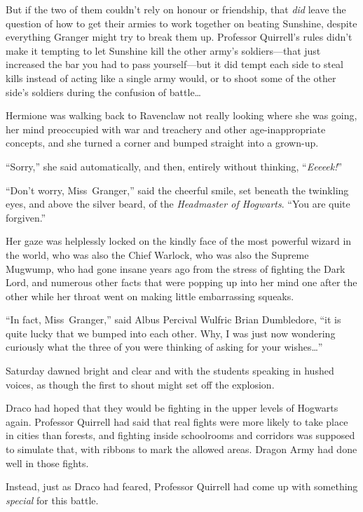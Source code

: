 But if the two of them couldn’t rely on honour or friendship, that \emph{did} leave the question of how to get their armies to work together on beating Sunshine, despite everything Granger might try to break them up. Professor Quirrell’s rules didn’t make it tempting to let Sunshine kill the other army’s soldiers—that just increased the bar you had to pass yourself—but it did tempt each side to steal kills instead of acting like a single army would, or to shoot some of the other side’s soldiers during the confusion of battle…

\later

Hermione was walking back to Ravenclaw not really looking where she was going, her mind preoccupied with war and treachery and other age-inappropriate concepts, and she turned a corner and bumped straight into a grown-up.

“Sorry,” she said automatically, and then, entirely without thinking, “\emph{Eeeeek!}”

“Don’t worry, Miss~Granger,” said the cheerful smile, set beneath the twinkling eyes, and above the silver beard, of the \emph{Headmaster of Hogwarts}. “You are quite forgiven.”

Her gaze was helplessly locked on the kindly face of the most powerful wizard in the world, who was also the Chief Warlock, who was also the Supreme Mugwump, who had gone insane years ago from the stress of fighting the Dark Lord, and numerous other facts that were popping up into her mind one after the other while her throat went on making little embarrassing squeaks.

“In fact, Miss~Granger,” said Albus Percival Wulfric Brian Dumbledore, “it is quite lucky that we bumped into each other. Why, I was just now wondering curiously what the three of you were thinking of asking for your wishes…”

\later

Saturday dawned bright and clear and with the students speaking in hushed voices, as though the first to shout might set off the explosion.

\later

Draco had hoped that they would be fighting in the upper levels of Hogwarts again. Professor Quirrell had said that real fights were more likely to take place in cities than forests, and fighting inside schoolrooms and corridors was supposed to simulate that, with ribbons to mark the allowed areas. Dragon Army had done well in those fights.

Instead, just as Draco had feared, Professor Quirrell had come up with something \emph{special} for this battle.

